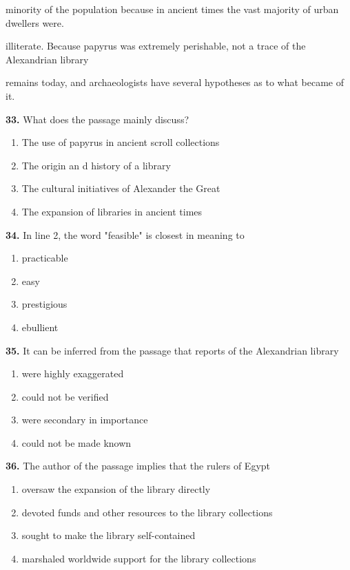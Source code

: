 \documentclass[12pt]{article}
\begin{document}
minority of the population because in ancient times the vast majority of urban dwellers were.\par
illiterate. Because papyrus was extremely perishable, not a trace of the Alexandrian library\par
remains today, and archaeologists have several hypotheses as to what became of it.\par
\endgroup
\medskip
\noindent\textbf{33.} What does the passage mainly discuss?
\begin{enumerate}[label=(\Alph*),leftmargin=*,itemsep=0.2em]
\item The use of papyrus in ancient scroll collections
\item The origin an d history of a library
\item The cultural initiatives of Alexander the Great
\item The expansion of libraries in ancient times
\end{enumerate}
\par
\vspace{0.25\baselineskip}
\noindent\textbf{34.} In line 2, the word "feasible" is closest in meaning to
\begin{enumerate}[label=(\Alph*),leftmargin=*,itemsep=0.2em]
\item practicable
\item easy
\item prestigious
\item ebullient
\end{enumerate}
\par
\vspace{0.25\baselineskip}
\noindent\textbf{35.} It can be inferred from the passage that reports of the Alexandrian library
\begin{enumerate}[label=(\Alph*),leftmargin=*,itemsep=0.2em]
\item were highly exaggerated
\item could not be verified
\item were secondary in importance
\item could not be made known
\end{enumerate}
\par
\vspace{0.25\baselineskip}
\noindent\textbf{36.} The author of the passage implies that the rulers of Egypt
\begin{enumerate}[label=(\Alph*),leftmargin=*,itemsep=0.2em]
\item oversaw the expansion of the library directly
\item devoted funds and other resources to the library collections
\item sought to make the library self-contained
\item marshaled worldwide support for the library collections
\end{enumerate}
\end{document}
